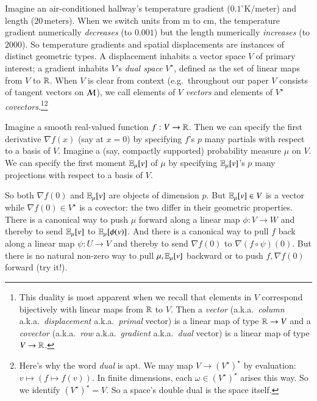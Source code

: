             Imagine an air-conditioned hallway's temperature gradient
            ($0.1^\circ \text{K}/\text{meter}$) and length
            ($20\,\text{meters}$).  When we switch units from m to cm, the
            temperature gradient numerically \emph{decreases} (to $0.001$) but
            the length numerically \emph{increases} (to $2000$).  So
            temperature gradients and spatial displacements are instances of
            distinct geometric types.  A displacement inhabits a vector
            space $V$ of primary interest; a gradient inhabits $V$'s \emph{dual
            space} $V^\star$, defined as the set of linear maps from $V$ to
            $\mathbb{R}$.  When $V$ is clear from context (e.g.\ throughout our paper
            $V$ consists of tangent vectors on $\mathcal{M}$), we call elements of $V$
            \emph{vectors} and elements of $V^\star$ \emph{covectors}.\footnote{
                This duality is most apparent when we
                recall that elements in $V$ correspond bijectively with 
                linear maps from $\mathbb{R}$ to $V$.  Then a
                \emph{vector} (a.k.a.\ \emph{column} a.k.a.\
                \emph{displacement} a.k.a.\ \emph{primal} vector) is a linear
                map of type $\mathbb{R}\to V$ and a \emph{covector} (a.k.a.\
                \emph{row} a.k.a.\ \emph{gradient} a.k.a.\ \emph{dual} vector)
                is a linear map of type $V\to \mathbb{R}$.
            }\footnote{
                Here's why the word \emph{dual} is apt.
                We may map $V \to (V^\star)^\star$ by evaluation: $v
                \mapsto (f \mapsto f(v))$.  In finite dimensions, each 
                $\omega\in (V^\star)^\star$ arises this way.  So we
                identify $(V^\star)^\star = V$.  So a space's double dual is
                the space itself.
            }


            Imagine a smooth real-valued function $f:V\to \mathbb{R}$.  Then 
            we can specify the first derivative $\nabla f(x)$ (say at $x=0$) 
            by specifying $f$'s $p$ many partials with respect to a basis of
            $V$.
            Imagine a (say, compactly supported) probability measure $\mu$ on
            $V$.  We can specify the first moment $\mathbb{E}_\mu[v]$ of $\mu$ 
            by specifying $\mathbb{E}_\mu[v]$'s $p$ many projections with respect
            to a basis of $V$.

            So both $\nabla f(0)$ and $\mathbb{E}_\mu[v]$ are objects of dimension
            $p$.  But $\mathbb{E}_\mu[v] \in V$ is a vector while $\nabla f(0) \in
            V^\star$ is a covector: the two differ in their geometric
            properties.
            There is a canonical way to push $\mu$ forward along a
            linear map $\phi:V\to W$ and thereby to send $\mathbb{E}_\mu[v]$ to
            $\mathbb{E}_\mu[\phi(v)]$.  And there is a canonical way to pull $f$ back
            along a linear map $\psi:U\to V$ and thereby to send $\nabla f(0)$
            to $\nabla (f\circ \psi)(0)$.  But there is no natural non-zero way
            to pull $\mu, \mathbb{E}_\mu[v]$ backward or to push $f, \nabla f(0)$
            forward (try it!).

